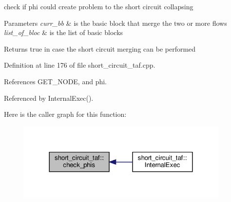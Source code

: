 check if phi could create problem to the short circuit collapsing 


\begin{DoxyParams}{Parameters}
{\em curr\+\_\+bb} & is the basic block that merge the two or more flows \\
\hline
{\em list\+\_\+of\+\_\+bloc} & is the list of basic blocks \\
\hline
\end{DoxyParams}
\begin{DoxyReturn}{Returns}
true in case the short circuit merging can be performed 
\end{DoxyReturn}


Definition at line 176 of file short\+\_\+circuit\+\_\+taf.\+cpp.



References G\+E\+T\+\_\+\+N\+O\+DE, and phi.



Referenced by Internal\+Exec().

Here is the caller graph for this function\+:
\nopagebreak
\begin{figure}[H]
\begin{center}
\leavevmode
\includegraphics[width=300pt]{dd/d1c/classshort__circuit__taf_ae6d5913aa8df5e681f440a8ed11981a2_icgraph}
\end{center}
\end{figure}
\mbox{\label{classshort__circuit__taf_aa20b443f2eb7bdefea17819fc62b2ce0}} 
